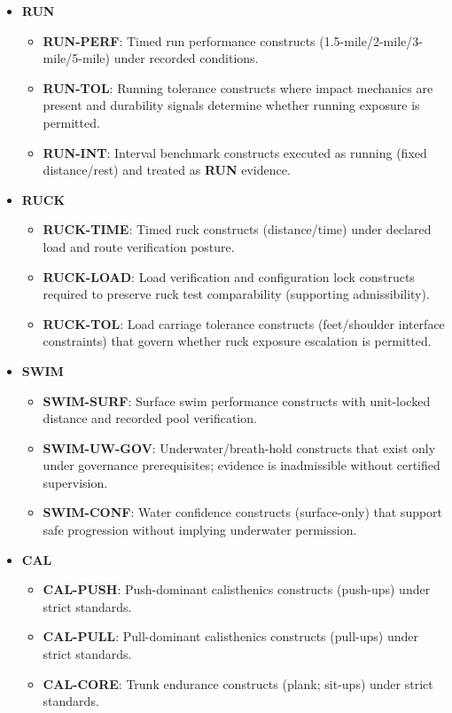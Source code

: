 \documentclass[10pt]{article}
\begin{document}
\begin{itemize}
\item \textbf{RUN}

  \begin{itemize}
  \item \textbf{RUN-PERF}: Timed run performance constructs (1.5-mile/2-mile/3-mile/5-mile) under recorded conditions.
  \item \textbf{RUN-TOL}: Running tolerance constructs where impact mechanics are present and durability signals determine whether running exposure is permitted.
  \item \textbf{RUN-INT}: Interval benchmark constructs executed as running (fixed distance/rest) and treated as \textbf{RUN} evidence.
  \end{itemize}

\item \textbf{RUCK}

  \begin{itemize}
  \item \textbf{RUCK-TIME}: Timed ruck constructs (distance/time) under declared load and route verification posture.
  \item \textbf{RUCK-LOAD}: Load verification and configuration lock constructs required to preserve ruck test comparability (supporting admissibility).
  \item \textbf{RUCK-TOL}: Load carriage tolerance constructs (feet/shoulder interface constraints) that govern whether ruck exposure escalation is permitted.
  \end{itemize}

\item \textbf{SWIM}

  \begin{itemize}
  \item \textbf{SWIM-SURF}: Surface swim performance constructs with unit-locked distance and recorded pool verification.
  \item \textbf{SWIM-UW-GOV}: Underwater/breath-hold constructs that exist only under governance prerequisites; evidence is inadmissible without certified supervision.
  \item \textbf{SWIM-CONF}: Water confidence constructs (surface-only) that support safe progression without implying underwater permission.
  \end{itemize}

\item \textbf{CAL}

  \begin{itemize}
  \item \textbf{CAL-PUSH}: Push-dominant calisthenics constructs (push-ups) under strict standards.
  \item \textbf{CAL-PULL}: Pull-dominant calisthenics constructs (pull-ups) under strict standards.
  \item \textbf{CAL-CORE}: Trunk endurance constructs (plank; sit-ups) under strict standards.
  \end{itemize}


\end{itemize}
\end{document}
